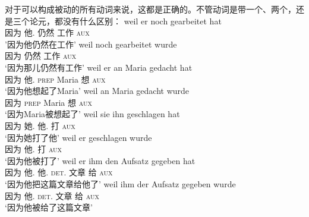 \noindent
对于可以构成被动的所有动词来说，这都是正确的。不管动词是带一个、两个，还是三个论元，都没有什么区别：
\eal
\label{beispiel-arbeiten}
\ex 
\gll weil er noch gearbeitet hat\\
	 因为 他.\nom{} 仍然 工作 \textsc{aux}\\
\glt '因为他仍然在工作'
\ex 
\gll weil noch gearbeitet wurde\\
	 因为 仍然 工作 \textsc{aux}\\
\glt `因为那儿仍然有工作'
\zl
\eal
\label{beispiel-denken}
\ex 
\gll weil er an Maria gedacht hat\\
	 因为 他.\nom{} \textsc{prep} Maria 想 \textsc{aux}\\
\glt `因为他想起了Maria'
\ex 
\gll weil an Maria gedacht wurde\\
	 因为 \textsc{prep} Maria 想 \textsc{aux}\\
\glt `因为Maria被想起了'
\zl
\eal
\ex 
\gll weil sie ihn geschlagen hat\\
	 因为 她.\nom{} 他.\acc{} 打 \textsc{aux}\\
\glt `因为她打了他'
\ex 
\gll weil er geschlagen wurde\\
	 因为 他.\nom{} 打 \textsc{aux}\\
\glt `因为他被打了'
\zl
\eal
\ex 
\gll weil er ihm den Aufsatz gegeben hat\\
      因为 他.\nom{} 他.\dat{} \textsc{det}.\acc{} 文章 给 \textsc{aux}\\
\glt `因为他把这篇文章给他了'
\ex 
\gll weil ihm der Aufsatz gegeben wurde\\
     因为 他.\dat{} \textsc{det}.\nom{} 文章 给 \textsc{aux}\\
\glt `因为他被给了这篇文章'
\zl


